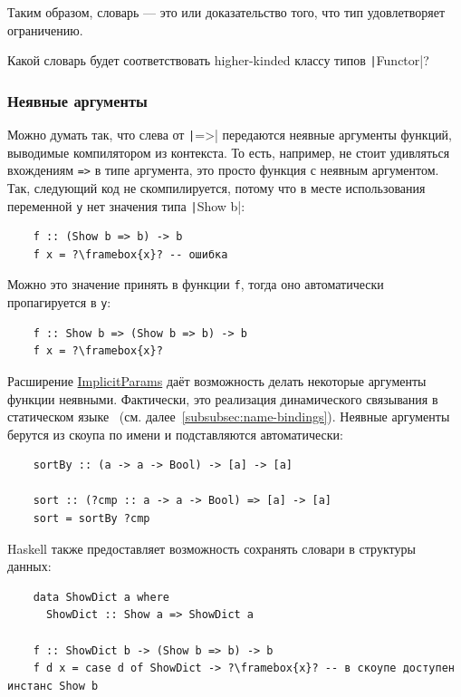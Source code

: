 Таким образом, словарь --- это  или доказательство того, что тип удовлетворяет ограничению.

\begin{task}
    Какой словарь будет соответствовать higher-kinded классу типов \texttt|Functor|?
\end{task}

\subsubsection{Неявные аргументы} \label{subsubsec:ad-hoc-implicits}

Можно думать так, что слева от \texttt|=>| передаются неявные аргументы функций, выводимые компилятором из контекста.
То есть, например, не стоит удивляться вхождениям \texttt{=>} в типе аргумента, это просто функция с неявным аргументом.
Так, следующий код не скомпилируется, потому что в месте использования переменной \texttt{y} нет значения типа \texttt|Show b|:
\begin{verbatim}
    f :: (Show b => b) -> b
    f x = ?\framebox{x}? -- ошибка
\end{verbatim}
Можно это значение принять в функции \texttt{f}, тогда оно автоматически пропагируется в \texttt{y}:
\begin{verbatim}
    f :: Show b => (Show b => b) -> b
    f x = ?\framebox{x}?
\end{verbatim}

Расширение \href{https://ghc.gitlab.haskell.org/ghc/doc/users_guide/exts/implicit_parameters.html}{ImplicitParams} даёт возможность делать некоторые аргументы функции неявными.
Фактически, это реализация динамического связывания в статическом языке~\cite{lewis2000implicit} (см. далее\ \ref{subsubsec:name-bindings}).
Неявные аргументы берутся из скоупа по имени и подставляются автоматически:
\begin{verbatim}
    sortBy :: (a -> a -> Bool) -> [a] -> [a]

    sort :: (?cmp :: a -> a -> Bool) => [a] -> [a]
    sort = sortBy ?cmp
\end{verbatim}

Haskell также предоставляет возможность сохранять словари в структуры данных:
\begin{verbatim}
    data ShowDict a where
      ShowDict :: Show a => ShowDict a

    f :: ShowDict b -> (Show b => b) -> b
    f d x = case d of ShowDict -> ?\framebox{x}? -- в скоупе доступен инстанс Show b
\end{verbatim}

